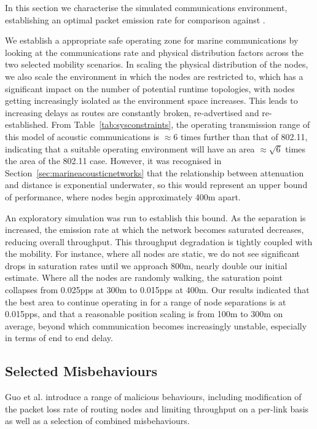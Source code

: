 \documentclass[conference]{IEEEtran}
\begin{document}
In this section we characterise the simulated communications environment, establishing an optimal packet emission rate for comparison against \cite{Guo11}.

We establish a appropriate safe operating zone for marine communications by looking at the communications rate and physical distribution factors across the two selected mobility scenarios.
In scaling the physical distribution of the nodes, we also scale the environment in which the nodes are restricted to, which has a significant impact on the number of potential runtime topologies, with nodes getting increasingly isolated as the environment space increases.
This leads to increasing delays as routes are constantly broken, re-advertised and re-established. 
From Table~\ref{tab:sysconstraints}, the operating transmission range of this model of acoustic communications is $\approx 6$ times further than that of 802.11, indicating that a suitable operating environment will have an area $\approx \sqrt{6}$ times the area of the 802.11 case.
However, it was recognised in Section~\ref{sec:marineacousticnetworks} that the relationship between attenuation and distance is exponential underwater, so this would represent an upper bound of performance, where nodes begin approximately 400m apart. 

An exploratory simulation was run to establish this bound.
As the separation is increased, the emission rate at which the network becomes saturated decreases, reducing overall throughput. 
This throughput degradation is tightly coupled with the mobility.
For instance, where all nodes are static, we do not see significant drops in saturation rates until we approach 800m, nearly double our initial estimate. 
Where all the nodes are randomly walking, the saturation point collapses from 0.025pps at 300m to 0.015pps at 400m.
Our results indicated that the best area to continue operating in for a range of node separations is at 0.015pps, and that a reasonable position scaling is from 100m to 300m on average, beyond which communication becomes increasingly unstable, especially in terms of end to end delay.


\subsection{Selected Misbehaviours}

Guo et al. introduce a range of malicious behaviours, including modification of the packet loss rate of routing nodes and limiting throughput on a per-link basis as well as a selection of combined misbehaviours. 
\end{document}
